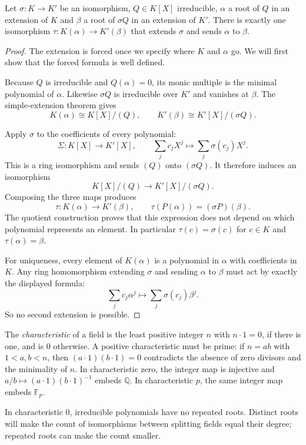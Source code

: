 \begin{lemma}\label{lem:extend1}
Let $\sigma:K\to K'$ be an isomorphism, $Q\in K[X]$ irreducible, $\alpha$ a root of $Q$ in an extension of $K$ and $\beta$ a root of $\sigma Q$ in an extension of $K'$. There is exactly one isomorphism $\tau:K(\alpha)\to K'(\beta)$ that extends $\sigma$ and sends $\alpha$ to $\beta$.
\end{lemma}
\begin{proof}
The extension is forced once we specify
where $K$ and $\alpha$ go. We will
first show that the forced formula
is well defined.

Because $Q$ is irreducible and
$Q(\alpha)=0$, its monic multiple
is the minimal polynomial of $\alpha$.
Likewise $\sigma Q$ is irreducible
over $K'$ and vanishes at $\beta$.
The simple-extension theorem gives
\[
K(\alpha)\cong K[X]/(Q),
\qquad
K'(\beta)\cong K'[X]/(\sigma Q).
\]

Apply $\sigma$ to the coefficients
of every polynomial:
\[
\Sigma:K[X]\to K'[X],\qquad
\sum_j c_jX^j\mapsto\sum_j\sigma(c_j)X^j.
\]
This is a ring isomorphism and sends
$(Q)$ onto $(\sigma Q)$.
It therefore induces an isomorphism
\[
K[X]/(Q)\longrightarrow K'[X]/(\sigma Q).
\]
Composing the three maps produces
\[
\tau:K(\alpha)\to K'(\beta),
\qquad
\tau(P(\alpha))=(\sigma P)(\beta).
\]
The quotient construction proves that
this expression does not depend on
which polynomial represents an element.
In particular $\tau(c)=\sigma(c)$
for $c\in K$ and $\tau(\alpha)=\beta$.

For uniqueness, every element of
$K(\alpha)$ is a polynomial in $\alpha$
with coefficients in $K$. Any ring
homomorphism extending $\sigma$ and
sending $\alpha$ to $\beta$ must act by
exactly the displayed formula:
\[
\sum_jc_j\alpha^j\longmapsto
\sum_j\sigma(c_j)\beta^j.
\]
So no second extension is possible.
\end{proof}

The \emph{characteristic} of a field is the least positive integer $n$
with $n\cdot1=0$, if there is one, and is $0$ otherwise. A positive
characteristic must be prime: if $n=ab$ with $1<a,b<n$, then
$(a\cdot1)(b\cdot1)=0$ contradicts the absence of zero divisors and
the minimality of $n$. In characteristic zero, the integer map is injective
and $a/b\mapsto(a\cdot1)(b\cdot1)^{-1}$ embeds $\mathbb Q$.
In characteristic $p$, the same integer map embeds $\mathbb F_p$.

In characteristic $0$, irreducible polynomials have no repeated roots.
Distinct roots will make the count of isomorphisms between splitting
fields equal their degree; repeated roots can make the count smaller.

